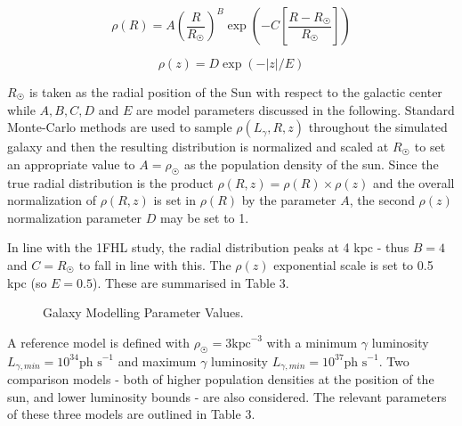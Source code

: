 \documentclass{PoS}
\begin{document}
\begin{equation}
\rho(R) = A\left(\frac{R}{R_{\astrosun}}\right)^{B} \exp\left(-C\left[\frac{R-R_{\astrosun}}{R_{\astrosun}}\right]\right)
\end{equation}

\begin{equation}
\rho(z) = D \exp(-|z|/E)
\end{equation}

$R_{\astrosun}$ is taken as the radial position of the Sun with respect to the galactic center while $A, B, C, D$ and $E$ are model parameters discussed in the following. Standard Monte-Carlo methods are used to sample $\rho(L_{\gamma}, R, z)$ throughout the simulated galaxy and then the resulting distribution is normalized and scaled at $R_{\astrosun}$ to set an appropriate value to $A = \rho_{\astrosun}$ as the population density of the sun. Since the true radial distribution is the product $\rho(R, z) = \rho(R) \times \rho(z)$ and the overall normalization of $\rho(R, z)$ is set in $\rho(R)$ by the parameter $A$, the second $\rho(z)$ normalization parameter $D$ may be set to 1.

In line with the 1FHL study, the radial distribution peaks at 4 kpc - thus $B = 4$ and $C = R_{\astrosun}$ to fall in line with this. The $\rho(z)$ exponential scale is set to 0.5 kpc (so $E=0.5$).  These are summarised in Table 3. 

\begin{figure}
\centering
{}
\caption{Galaxy Modelling Parameter Values.}
\end{figure}

A reference model is defined with $\rho_{\astrosun} = 3 \text{kpc}^{-3}$ with a minimum $\gamma$ luminosity $L_{\gamma, min} = 10^{34} \text{ph s}^{-1}$ and maximum $\gamma$ luminosity $L_{\gamma, min} = 10^{37} \text{ph s}^{-1}$. Two comparison models - both of higher population densities at the position of the sun, and lower luminosity bounds - are also considered. The relevant parameters of these three models are outlined in Table 3.
\end{document}
